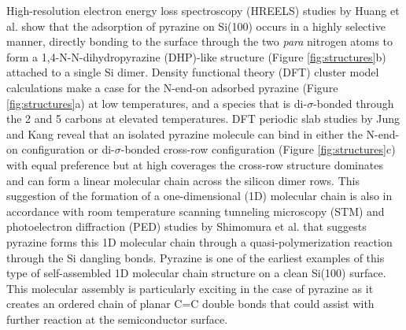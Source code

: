 \documentclass{article}
\begin{document}
High-resolution electron energy loss spectroscopy (HREELS) studies by Huang et al.\cite{huang_selective_2004} show that the adsorption of pyrazine on Si(100) occurs in a highly selective manner, directly bonding to the surface through the two \textit{para} nitrogen atoms to form a 1,4-N-N-dihydropyrazine (DHP)-like structure (Figure \ref{fig:structures}b) attached to a single Si dimer. Density functional theory (DFT) cluster model calculations\cite{lu_chemisorption_2002} make a case for the N-end-on adsorbed pyrazine (Figure \ref{fig:structures}a) at low temperatures, and a species that is di-$\sigma$-bonded through the 2 and 5 carbons at elevated temperatures. DFT periodic slab studies by Jung and Kang\cite{jung_adsorption_2009} reveal that an isolated pyrazine molecule can bind in either the N-end-on configuration or di-$\sigma$-bonded cross-row configuration (Figure \ref{fig:structures}c) with equal preference but at high coverages the cross-row structure dominates and can form a linear molecular chain across the silicon dimer rows. This suggestion of the formation of a one-dimensional (1D) molecular chain is also in accordance with room temperature scanning tunneling microscopy (STM) and photoelectron diffraction (PED) studies by Shimomura et al. \cite{omiya_well-oriented_2012} that suggests pyrazine forms this 1D molecular chain through a quasi-polymerization reaction through the Si dangling bonds. Pyrazine is one of the earliest examples of this type of self-assembled 1D molecular chain structure on a clean Si(100) surface.\cite{ng_mechanism_2013} This molecular assembly is particularly exciting in the case of pyrazine as it creates an ordered chain of planar C=C double bonds that could assist with further reaction at the semiconductor surface. 
\end{document}
